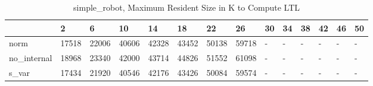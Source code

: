 \begin{table}
\caption{simple_robot, Maximum Resident Size in K to Compute LTL}
\label{simple_robot_LTL_size}
\begin{tabular}{llllllllllllll}
\toprule
 & 2 & 6 & 10 & 14 & 18 & 22 & 26 & 30 & 34 & 38 & 42 & 46 & 50 \\
\midrule
norm & 17518 & 22006 & 40606 & 42328 & 43452 & 50138 & 59718 & - & - & - & - & - & - \\
no_internal & 18968 & 23340 & 42000 & 43714 & 44826 & 51552 & 61098 & - & - & - & - & - & - \\
s_var & 17434 & 21920 & 40546 & 42176 & 43426 & 50084 & 59574 & - & - & - & - & - & - \\
\bottomrule
\end{tabular}
\end{table}
